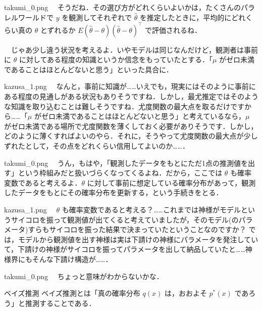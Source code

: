 \documentclass[b5paper,xelatex,ja=standard,10pt]{bxjsarticle}
\begin{document}
\begin{SERIFU}[colback=PaleGold]{takumi_0.png}
　そうだね．その選び方がどれくらいよいかは，たくさんのパラレルワールドで $y$ を観測してそれぞれで $\hat{\theta}$ を推定したときに，平均的にどれくらい真の $\theta$ とずれるか $E(\hat{\theta} - \theta)(\hat{\theta} - \theta)^\top$ で評価されるね．

　じゃあ少し違う状況を考えるよ．いやモデルは同じなんだけど，観測者は事前に $\theta$ に対してある程度の知識というか信念をもっていたとする．「$\mu$ がゼロ未満であることはほとんどないと思う」といった具合に．
\end{SERIFU}


\begin{SERIFU}[colback=PaleIris]{kazusa_1.png}
　なんと，事前に知識が……いえでも，現実にはそのように事前にある程度の見通しがある状況もありそうですね．しかし，最尤推定ではそのような知識を取り込むことは難しそうですね．尤度関数の最大点を取るだけですから……「$\mu$ がゼロ未満であることはほとんどないと思う」と考えているなら，$\mu$ がゼロ未満である場所で尤度関数を薄くしておく必要がありそうです．しかし，どのように薄くすればよいのやら．それに，そうやって尤度関数の最大点が少しずれたとして，その点をどれくらい信用してよいのか……．
\end{SERIFU}


\begin{SERIFU}[colback=PaleGold]{takumi_0.png}
　うん，もはや，「観測したデータをもとにただ1点の推測値を出す」という枠組みだと扱いづらくなってくるよね．だから，ここでは $\theta$ も確率変数であると考えるよ．$\theta$ に対して事前に想定している確率分布があって，観測したデータをもとにその確率分布を更新する，という手続きをとる．
\end{SERIFU}


\begin{SERIFU}[colback=PaleIris]{kazusa_1.png}
　$\theta$ も確率変数であると考える？……これまでは神様がモデルというサイコロを振って観測値が出てくると考えていましたが，そのモデル(のパラメータ)すらもサイコロを振った結果で決まっていたということなのですか？ では，モデルから観測値を出す神様は実は下請けの神様にパラメータを発注していて，下請けの神様がサイコロを振ってパラメータを出して納品していたと……神様界にもそんな下請け構造が……．
\end{SERIFU}


\begin{SERIFU}[colback=PaleGold]{takumi_0.png}
　ちょっと意味がわからないかな．
\end{SERIFU}


\begin{PROP}[colback=White]{ベイズ推測 \cite{watanabe2012}}
ベイズ推測とは「真の確率分布 $q(x)$ は，おおよそ $p^\ast(x)$ であろう」と推測することである．
\end{PROP}
\end{document}
